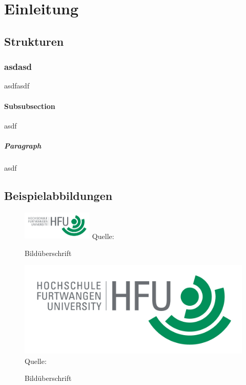 \chapter{Einleitung}

\section{Strukturen}

\subsection{asdasd}
asdfasdf

\subsubsection{Subsubsection}
asdf

\paragraph{Paragraph}
asdf

\section{Beispielabbildungen}

\lipsum[10]
\begin{figure}
\caption{Bildüberschrift}
\centering
\includegraphics[width=0.3\textwidth]{content/pictures/hfu}
Quelle: \cite{s11wasml}
\label{pic:bild2}
\end{figure}
\lipsum[10]

\begin{figure}
\caption{Bildüberschrift}
\includegraphics[width=1\textwidth]{content/pictures/hfu}
Quelle: \cite{s11wasml}
\label{pic:bild1}
\end{figure}

